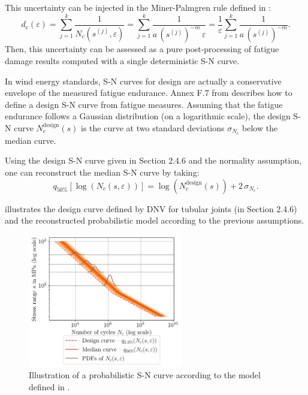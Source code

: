 This uncertainty can be injected in the Miner-Palmgren rule defined in : 
\begin{equation}
    d_{\mathrm{c}}(\varepsilon) = \sum_{j=1}^k \frac{1}{N_c(s^{(j)}, \varepsilon)}
            = \sum_{j=1}^k \frac{1}{a \, \left(s^{(j)}\right)^{-m} \, \varepsilon}
            = \frac{1}{\varepsilon} \sum_{j=1}^k \frac{1}{a \, \left(s^{(j)}\right)^{-m}}.
\end{equation}
Then, this uncertainty can be assessed as a pure post-processing of fatigue damage results computed with a single deterministic S-N curve. 

In wind energy standards, S-N curves for design are actually a conservative envelope of the measured fatigue endurance. 
Annex F.7 from \citet{dnv_fatigue_2016} describes how to define a design S-N curve from fatigue measures. 
Assuming that the fatigue endurance follows a Gaussian distribution (on a logarithmic scale), the design S-N curve $N_c^{\mathrm{design}}(s)$ is the curve at two standard deviations $\sigma_{N_c}$ below the median curve. 

Using the design S-N curve given in Section 2.4.6 \citet{dnv_fatigue_2016} and the normality assumption, one can reconstruct the median S-N curve by taking: 
\begin{equation}
    q_{50\%}[\log(N_c(s, \varepsilon))]= \log(N_c^{\mathrm{design}}(s)) + 2 \, \sigma_{N_c}. 
\end{equation}

 illustrates the design curve defined by DNV for tubular joints (in Section 2.4.6) and the reconstructed probabilistic model according to the previous assumptions. 

\begin{figure}
    \centering
    \includegraphics[width=0.6\textwidth]{../numerical_experiments/chapter2/figures/probabilistic_fatigue.png}
    \caption{Illustration of a probabilistic S-N curve according to the model defined in \citet{guede_2007}.}
    \label{fig:probabilistic_SN}
\end{figure}


